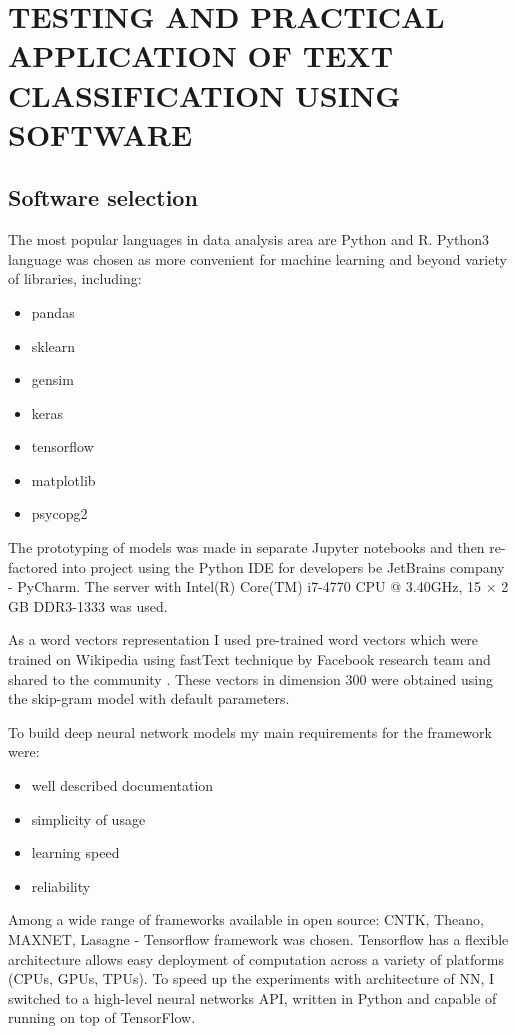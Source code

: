 \chapter{\uppercase{Testing and practical application of text classification using software}} \label{chapt3}
\section{Software selection} \label{sect3_1}

The most popular languages in data analysis area are Python and R.
Python3 language was chosen as more convenient for machine learning and beyond variety of libraries, including:

\begin{itemize}
	\item pandas
	\item sklearn
	\item gensim
	\item keras
	\item tensorflow
	\item matplotlib
	\item psycopg2
\end{itemize}

The prototyping of models was made in separate Jupyter notebooks and then re-factored into 
project using the Python IDE for developers be JetBrains company - PyCharm. 
The server with  Intel(R) Core(TM) i7-4770 CPU @ 3.40GHz, 15 $\times$ 2 GB DDR3-1333 was used. 

As a word vectors representation I used pre-trained word vectors which were trained on Wikipedia using fastText technique by Facebook research team and shared to the community \cite{fasttext}. These vectors in dimension 300 were obtained using the skip-gram model with default parameters.

To build deep neural network models my main requirements for the framework were:
\begin{itemize}
	\item well described documentation
	\item simplicity of usage
	\item learning speed
	\item reliability
\end{itemize}

Among a wide range of frameworks available in open source: 
CNTK, Theano, MAXNET, Lasagne - Tensorflow framework was chosen. 
Tensorflow has a flexible architecture allows easy deployment of computation across a variety of platforms (CPUs, GPUs, TPUs). To speed up the experiments with architecture of NN, I switched to a high-level neural networks API, written in Python and capable of running on top of TensorFlow. 

